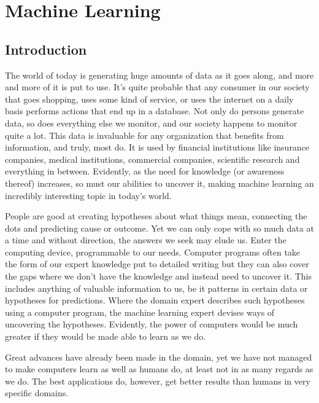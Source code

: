 \chapter{Machine Learning}

\section{Introduction}
The world of today is generating huge amounts of data
as it goes along,
and more and more of it is put to use.
It's quite probable that any consumer in our society
that goes shopping,
uses some kind of service,
or uses the internet
on a daily basis
performs actions that end up in a database.
Not only do persons generate data,
so does everything else we monitor,
and our society happens to monitor quite a lot.
This data is invaluable for any organization that benefits
from information,
and truly, most do.
It is used by financial institutions like insurance companies,
medical institutions, commercial companies, scientific research
and everything in between.
Evidently, as the need for knowledge (or awareness thereof)
increases, so must our abilities to uncover it,
making machine learning an incredibly interesting topic
in today's world.


People are good at creating hypotheses
about what things mean,
connecting the dots
and predicting cause or outcome.
Yet we can only cope
with so much data at a time
and without direction,
the answers we seek may elude us.
Enter the computing device,
programmable to our needs.
Computer programs often take the form
of our expert knowledge put to detailed writing
but they can also cover the gaps where
we don't have the knowledge
and instead need to uncover it.
This includes anything of valuable information to us,
be it patterns in certain data or hypotheses for predictions.
Where the domain expert describes such hypotheses
using a computer program,
the machine learning expert devises ways of uncovering
the hypotheses.
Evidently, the power of computers would be much greater
if they would be made able to learn as we do.

Great advances have already been made in the domain,
yet we have not managed to make computers learn
as well as humans do,
at least not in as many regards as we do.
The best applications do, however,
get better results than humans in very specific domains.


\paragraph{}
Machine learning is a collection of methods
used to bridge the aforementioned gap
between data and knowledge.
A machine learning algorithm learns from data
and learns an hypothesis or model on it,
which can then be used to make predictions on future data.
This separates it from other algorithms
designed by an expert
that follow a static rule set.
It is inherently an interdisciplinary field,
with its roots firmly embedded
in a statistical foundation
combined with AI,
drawing inspiration from fields such as
information theory,
complexity theory,
psychology
and other fields.

